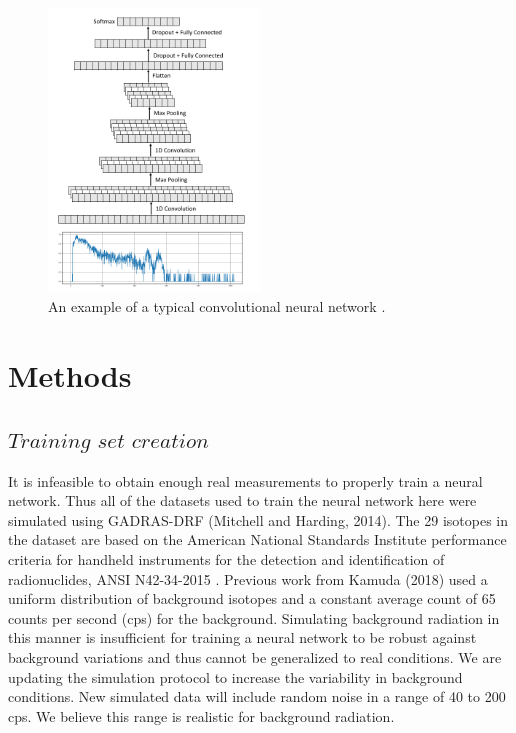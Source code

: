 \documentclass{anstrans}
\begin{document}
\begin{figure}[h]
	\centering
	\includegraphics[width=0.5\textwidth]{../figures/cnn-figure.png}
	\caption{An example of a typical convolutional neural network \cite{kamudaComparisonMachineLearning2018a}.}
	\label{fig:cnn}
\end{figure}

\section{Methods}
\subsection{$\textit{Training set creation}$}
It is infeasible to obtain enough real measurements to properly train a neural network. 
Thus all of the datasets used to train the neural network here were simulated using GADRAS-DRF (Mitchell and Harding, 2014). 
The 29 isotopes in the dataset are based on the American National Standards Institute performance criteria for handheld instruments for the detection and identification of radionuclides, ANSI N42-34-2015 \cite{AmericanNationalStandard2016}. 
Previous work from Kamuda (2018) \cite{kamudaComparisonMachineLearning2018a} used a uniform distribution of background isotopes and a constant average count of 65 counts per second (cps) for the background. 
Simulating background radiation in this manner is insufficient for training a neural network to be robust against background variations and thus cannot be generalized to real conditions. 
We are updating the simulation protocol to increase the variability in background conditions. New simulated data will include random noise in a range of 40 to 200 cps. 
We believe this range is realistic for background radiation.
\end{document}

